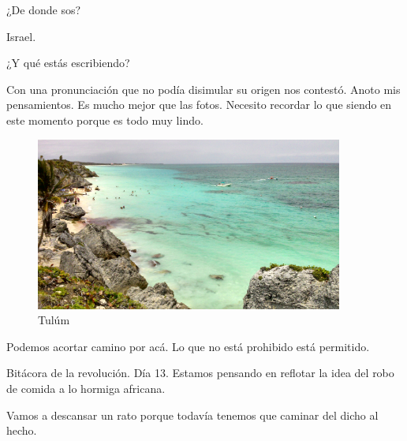 \documentclass[11pt,twoside,openright,a6paper]{book}
\begin{document}
¿De donde sos?

Israel.

¿Y qué estás escribiendo?

Con una pronunciación que no podía disimular su origen nos contestó. Anoto
mis pensamientos. Es mucho mejor que las fotos. Necesito recordar lo que
siendo en este momento porque es todo muy lindo.

\begin{figure}[H]
  \centering
    \includegraphics[width=0.9\textwidth]{fotos/2013/tulum}
  \caption{Tulúm}
  \label{Tulúm}
\end{figure}


\vspace{0.5cm}
\hrulefill\hspace{0.2cm} \decofourleft\decofourright \hspace{0.2cm} \hrulefill
\vspace{0.5cm}

Podemos acortar camino por acá. Lo que no está prohibido está permitido.


\vspace{0.5cm}
\hrulefill\hspace{0.2cm} \decofourleft\decofourright \hspace{0.2cm} \hrulefill
\vspace{0.5cm}

Bitácora de la revolución. Día 13. Estamos pensando en reflotar la idea
del robo de comida a lo hormiga africana.


\vspace{0.5cm}
\hrulefill\hspace{0.2cm} \decofourleft\decofourright \hspace{0.2cm} \hrulefill
\vspace{0.5cm}

Vamos a descansar un rato porque todavía tenemos que caminar del dicho
al hecho.
\end{document}
